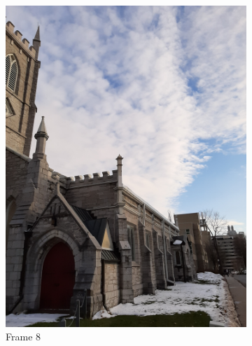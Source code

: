\documentclass[conference]{IEEEtran}
\begin{document}
\begin{figure}[!h]
\begin{subfigure}[b]{0.2\linewidth}
    \includegraphics[width=\linewidth, angle = -90]{images/frame8.jpg}
    \caption{Frame 8}
  \end{subfigure}
  \begin{subfigure}[b]{0.2\linewidth}

\end{subfigure}
\end{figure}
\end{document}
